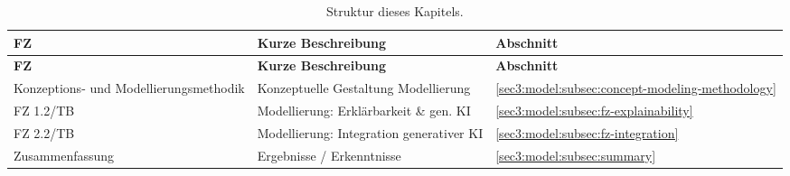 {
    \def\arraystretch{1.1}%
    \begin{xltabular}{\linewidth}{
            @{}
            >{
                \linewidth
                \raggedright\arraybackslash
            }X
            >{
                \linewidth
                \raggedright\arraybackslash
            }X
            >{
                \linewidth
                \centering\arraybackslash
            }X
            @{}
    }


    \caption{Struktur dieses Kapitels.} 
    \label{sec3:model:table:structure} \\
        
    \toprule

    \textbf{FZ} & \textbf{Kurze Beschreibung} & \textbf{Abschnitt} \\
    
    \midrule
    
    \endfirsthead


    \toprule

    \textbf{FZ} & \textbf{Kurze Beschreibung} & \textbf{Abschnitt} \\
    
    \midrule
    
    \endhead
        

    Konzeptions- und Modellierungsmethodik & Konzeptuelle Gestaltung Modellierung & \cref{sec3:model:subsec:concept-modeling-methodology} \\
    FZ 1.2/TB & Modellierung: Erklärbarkeit \& gen. KI & \cref{sec3:model:subsec:fz-explainability} \\
    FZ 2.2/TB & Modellierung: Integration generativer KI & \cref{sec3:model:subsec:fz-integration} \\
    Zusammenfassung & Ergebnisse / Erkenntnisse & \cref{sec3:model:subsec:summary} \\
        
    \bottomrule 

    \end{xltabular}
}
